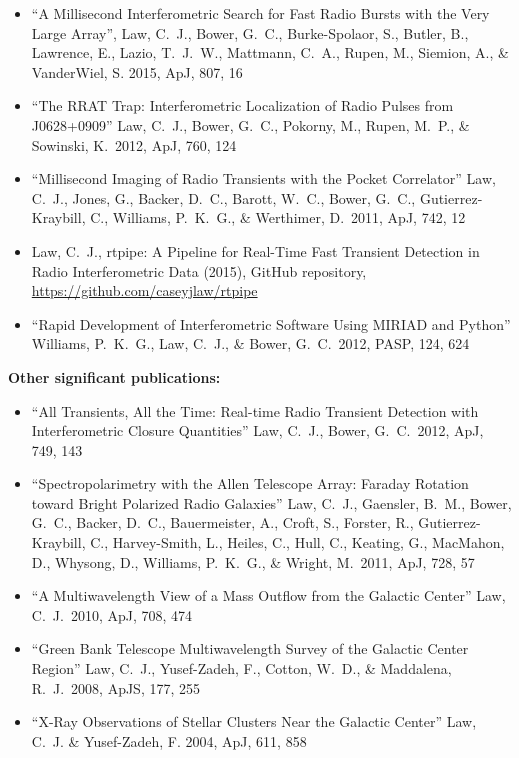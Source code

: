 \documentclass[11pt]{article}
\begin{document}
\begin{itemize}
 \item ``A Millisecond Interferometric Search for Fast Radio Bursts with the Very Large Array'', Law, C.~J., Bower, G.~C., Burke-Spolaor, S., Butler, B., Lawrence, E., Lazio, T.~J.~W., Mattmann, C.~A., Rupen, M., Siemion, A., \& VanderWiel, S. 2015, ApJ, 807, 16

 \item ``The RRAT Trap: Interferometric Localization of Radio Pulses from J0628+0909'' Law, C.~J., Bower, G.~C., Pokorny, M., Rupen, M.~P., \& Sowinski, K.\ 2012, ApJ, 760, 124

 \item ``Millisecond Imaging of Radio Transients with the Pocket Correlator'' Law, C.~J., Jones, G., Backer, D.~C., Barott, W.~C., Bower, G.~C., Gutierrez-Kraybill, C., Williams, P.~K.~G., \& Werthimer, D.\ 2011, ApJ, 742, 12

 \item Law, C.~J., rtpipe: A Pipeline for Real-Time Fast Transient Detection in Radio Interferometric Data (2015), GitHub repository, \url{https://github.com/caseyjlaw/rtpipe}

 \item ``Rapid Development of Interferometric Software Using MIRIAD and Python'' Williams, P.~K.~G., Law, C.~J., \& Bower, G.~C.\ 2012, PASP, 124, 624 

\end{itemize}

{\bf Other significant publications:}

\begin{itemize}
 \item ``All Transients, All the Time: Real-time Radio Transient Detection with Interferometric Closure Quantities'' Law, C.~J., Bower, G.~C.\ 2012, ApJ, 749, 143

 \item ``Spectropolarimetry with the Allen Telescope Array:  Faraday Rotation toward Bright Polarized Radio Galaxies'' Law, C.~J., Gaensler, B.~M., Bower, G.~C., Backer, D.~C., Bauermeister, A., Croft, S., Forster, R., Gutierrez-Kraybill, C., Harvey-Smith, L., Heiles, C., Hull, C., Keating, G., MacMahon, D., Whysong, D., Williams, P.~K.~G., \& Wright, M.\ 2011, ApJ, 728, 57

 \item ``A Multiwavelength View of a Mass Outflow from the Galactic Center'' Law, C.~J.\ 2010, ApJ, 708, 474

 \item ``Green Bank Telescope Multiwavelength Survey of the Galactic Center Region'' Law, C.~J., Yusef-Zadeh, F., Cotton, W.~D., \& Maddalena, R.~J.\ 2008, ApJS, 177, 255

 \item ``X-Ray Observations of Stellar Clusters Near the Galactic Center'' Law, C.~J. \& Yusef-Zadeh, F. 2004, ApJ, 611, 858

\end{itemize}
\end{document}
